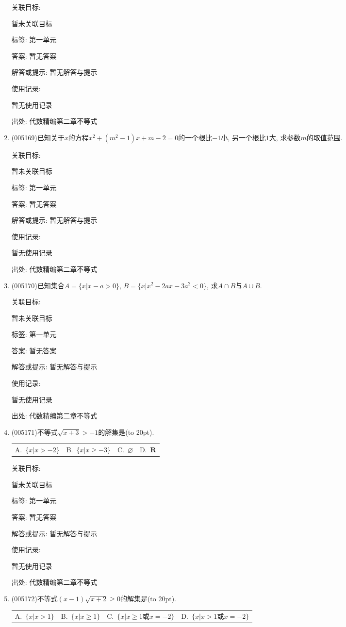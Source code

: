 \documentclass[10pt,a4paper]{article}
\newcommand{\bracket}[1]{(\hbox to #1pt{})}
\newcommand{\fourch}[4]{\par\begin{tabular}{p{.23\textwidth}p{.23\textwidth}p{.23\textwidth}p{.23\textwidth}}
A.~#1 &B.~#2& C.~#3& D.~#4
\end{tabular}}
\begin{document}
\begin{enumerate}[1.]
关联目标:

暂未关联目标



标签: 第一单元

答案: 暂无答案

解答或提示: 暂无解答与提示

使用记录:

暂无使用记录


出处: 代数精编第二章不等式
\item { (005169)}已知关于$x$的方程$x^2+(m^2-1)x+m-2=0$的一个根比$-1$小, 另一个根比$1$大, 求参数$m$的取值范围.


关联目标:

暂未关联目标



标签: 第一单元

答案: 暂无答案

解答或提示: 暂无解答与提示

使用记录:

暂无使用记录


出处: 代数精编第二章不等式
\item { (005170)}已知集合$A=\{x|x-a>0\}$, $B=\{x|x^2-2ax-3a^2<0\}$, 求$A\cap B$与$A\cup B$.


关联目标:

暂未关联目标



标签: 第一单元

答案: 暂无答案

解答或提示: 暂无解答与提示

使用记录:

暂无使用记录


出处: 代数精编第二章不等式
\item { (005171)}不等式$\sqrt{x+3}>-1$的解集是\bracket{20}.
\fourch{$\{x|x>-2\}$}{$\{x|x\ge -3\}$}{$\varnothing$}{$\mathbf{R}$}


关联目标:

暂未关联目标



标签: 第一单元

答案: 暂无答案

解答或提示: 暂无解答与提示

使用记录:

暂无使用记录


出处: 代数精编第二章不等式
\item { (005172)}不等式$(x-1)\sqrt{x+2}\ge 0$的解集是\bracket{20}.
\fourch{$\{x|x>1\}$}{$\{x|x\ge 1\}$}{$\{x|x\ge 1\text{或}x=-2\}$}{$\{x|x>1\text{或}x=-2\}$}



\end{enumerate}
\end{document}

